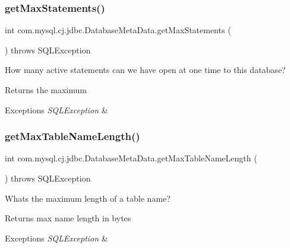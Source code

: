 \subsubsection{\texorpdfstring{get\+Max\+Statements()}{getMaxStatements()}}
{\footnotesize\ttfamily int com.\+mysql.\+cj.\+jdbc.\+Database\+Meta\+Data.\+get\+Max\+Statements (\begin{DoxyParamCaption}{ }\end{DoxyParamCaption}) throws S\+Q\+L\+Exception}

How many active statements can we have open at one time to this database?

\begin{DoxyReturn}{Returns}
the maximum 
\end{DoxyReturn}

\begin{DoxyExceptions}{Exceptions}
{\em S\+Q\+L\+Exception} & \\
\hline
\end{DoxyExceptions}
\mbox{\label{classcom_1_1mysql_1_1cj_1_1jdbc_1_1_database_meta_data_af978ccdd2bc8b3ae59560fb7d60c35b8}} 
\subsubsection{\texorpdfstring{get\+Max\+Table\+Name\+Length()}{getMaxTableNameLength()}}
{\footnotesize\ttfamily int com.\+mysql.\+cj.\+jdbc.\+Database\+Meta\+Data.\+get\+Max\+Table\+Name\+Length (\begin{DoxyParamCaption}{ }\end{DoxyParamCaption}) throws S\+Q\+L\+Exception}

What\textquotesingle{}s the maximum length of a table name?

\begin{DoxyReturn}{Returns}
max name length in bytes 
\end{DoxyReturn}

\begin{DoxyExceptions}{Exceptions}
{\em S\+Q\+L\+Exception} & \\
\hline
\end{DoxyExceptions}
\mbox{\label{classcom_1_1mysql_1_1cj_1_1jdbc_1_1_database_meta_data_a5069f21272831c21a1c4fb132193a53d}} 
